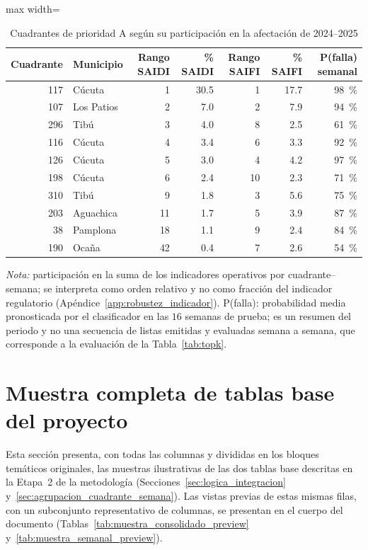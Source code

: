 \begin{table}[!htbp]
\centering
\small
\caption{Cuadrantes de prioridad A según su participación en la afectación de 2024--2025}
\label{tab:prioridad_a}
\begin{adjustbox}{max width=\linewidth}
\begin{tabular}{r l r r r r r}
\toprule
\textbf{Cuadrante} & \textbf{Municipio} & \textbf{Rango SAIDI} & \textbf{\% SAIDI} & \textbf{Rango SAIFI} & \textbf{\% SAIFI} & \textbf{P(falla) semanal} \\
\midrule
117 & Cúcuta     & 1  & 30.5 & 1  & 17.7 & 98~\% \\
107 & Los Patios & 2  & 7.0  & 2  & 7.9  & 94~\% \\
296 & Tibú       & 3  & 4.0  & 8  & 2.5  & 61~\% \\
116 & Cúcuta     & 4  & 3.4  & 6  & 3.3  & 92~\% \\
126 & Cúcuta     & 5  & 3.0  & 4  & 4.2  & 97~\% \\
198 & Cúcuta     & 6  & 2.4  & 10 & 2.3  & 71~\% \\
310 & Tibú       & 9  & 1.8  & 3  & 5.6  & 75~\% \\
203 & Aguachica  & 11 & 1.7  & 5  & 3.9  & 87~\% \\
38  & Pamplona   & 18 & 1.1  & 9  & 2.4  & 84~\% \\
190 & Ocaña      & 42 & 0.4  & 7  & 2.6  & 54~\% \\
\bottomrule
\end{tabular}
\end{adjustbox}

\vspace{2pt}
\noindent\footnotesize\textit{Nota:} participación en la suma de los indicadores operativos por cuadrante--semana; se interpreta como orden relativo y no como fracción del indicador regulatorio (Apéndice~\ref{app:robustez_indicador}). P(falla): probabilidad media pronosticada por el clasificador en las $16$ semanas de prueba; es un resumen del periodo y no una secuencia de listas emitidas y evaluadas semana a semana, que corresponde a la evaluación de la Tabla~\ref{tab:topk}.
\end{table}

\section{Muestra completa de tablas base del proyecto}
\label{app:muestra-tablas-base}

Esta sección presenta, con todas las columnas y divididas en los bloques temáticos originales, las muestras ilustrativas de las dos tablas base descritas en la Etapa~2 de la metodología (Secciones~\ref{sec:logica_integracion} y~\ref{sec:agrupacion_cuadrante_semana}). Las vistas previas de estas mismas filas, con un subconjunto representativo de columnas, se presentan en el cuerpo del documento (Tablas~\ref{tab:muestra_consolidado_preview} y~\ref{tab:muestra_semanal_preview}).

